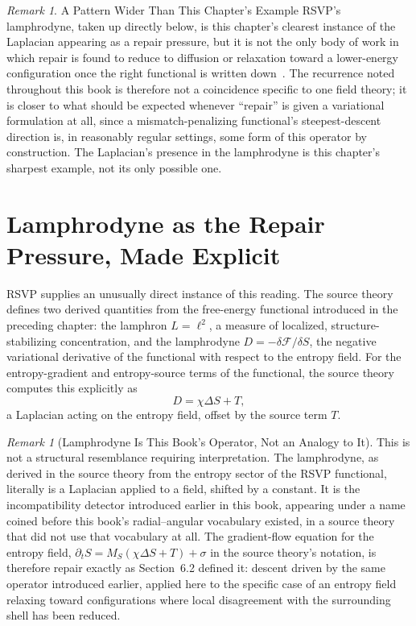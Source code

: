 \documentclass[11pt,fleqn]{book}
\numberwithin{equation}{chapter}
\theoremstyle{plain}
\theoremstyle{definition}
\theoremstyle{remark}
\newtheorem{remark}[theorem]{Remark}
\providecommand{\enquote}[1]{``#1''}
\begin{document}
\begin{remark}{A Pattern Wider Than This Chapter's Example}
RSVP's lamphrodyne, taken up directly below, is this chapter's clearest instance of the Laplacian appearing as a repair pressure, but it is not the only body of work in which repair is found to reduce to diffusion or relaxation toward a lower-energy configuration once the right functional is written down~\cite{observability-restorability}. The recurrence noted throughout this book is therefore not a coincidence specific to one field theory; it is closer to what should be expected whenever \enquote{repair} is given a variational formulation at all, since a mismatch-penalizing functional's steepest-descent direction is, in reasonably regular settings, some form of this operator by construction. The Laplacian's presence in the lamphrodyne is this chapter's sharpest example, not its only possible one.
\end{remark}

\section{Lamphrodyne as the Repair Pressure, Made Explicit}

RSVP supplies an unusually direct instance of this reading. The source theory~\cite{holonomic} defines two derived quantities from the free-energy functional introduced in the preceding chapter: the lamphron \(L=\ell^2\), a measure of localized, structure-stabilizing concentration, and the lamphrodyne \(D=-\delta\mathcal F/\delta S\), the negative variational derivative of the functional with respect to the entropy field. For the entropy-gradient and entropy-source terms of the functional, the source theory computes this explicitly as
\begin{equation}
D = \chi\Delta S + T,
\end{equation}
a Laplacian acting on the entropy field, offset by the source term \(T\).

\begin{remark}[Lamphrodyne Is This Book's Operator, Not an Analogy to It]
This is not a structural resemblance requiring interpretation. The lamphrodyne, as derived in the source theory from the entropy sector of the RSVP functional, literally is a Laplacian applied to a field, shifted by a constant. It is the incompatibility detector introduced earlier in this book, appearing under a name coined before this book's radial--angular vocabulary existed, in a source theory that did not use that vocabulary at all. The gradient-flow equation for the entropy field, \(\partial_t S = M_S(\chi\Delta S + T)+\sigma\) in the source theory's notation, is therefore repair exactly as Section~6.2 defined it: descent driven by the same operator introduced earlier, applied here to the specific case of an entropy field relaxing toward configurations where local disagreement with the surrounding shell has been reduced.
\end{remark}
\end{document}
